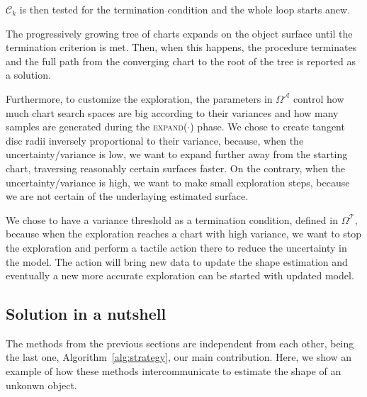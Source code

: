 $\mathcal{C}_k$ is then tested for the termination condition and the whole loop
starts anew.

The progressively growing tree of charts expands on the object surface until
the termination criterion is met. Then, when this happens, the procedure terminates and the full
path from the converging chart to the root of the tree is reported as a solution.

Furthermore, to customize the exploration, the parameters in $\Omega^{\mathcal{A}}$ 
control how much chart search spaces are big according to their variances and how many
samples are generated during the \textsc{expand}($\cdot$) phase. 
We chose to create tangent disc radii inversely proportional to their variance,
because, when the uncertainty/variance is low, we want to expand further
away from the starting chart, traversing reasonably certain surfaces faster.
On the contrary, when the uncertainty/variance is high, we want to make small
exploration steps, because we are not certain of the underlaying estimated surface.

We chose to have a variance threshold as a termination condition, defined in $\Omega^{\mathcal{T}}$,
because when the exploration reaches a chart with high variance, we want to stop
the exploration and perform a tactile action there to reduce the uncertainty in the
model. 
The action will bring new data to update the shape estimation and eventually 
a new more accurate exploration can be started with updated model.

\subsection{Solution in a nutshell}
\label{sec:summary}

The methods from the previous sections are independent from each other, being the last one, Algorithm~\ref{alg:strategy}, our main contribution. Here, we show an example of how these methods intercommunicate to estimate the shape of an unkonwn object.

